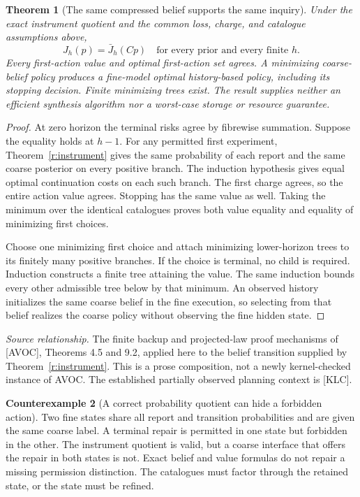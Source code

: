 \documentclass[11pt,oneside,openany]{book}
\newtheorem{theorem}{Theorem}[chapter]
\theoremstyle{definition}\newtheorem{definition}[theorem]{Definition}
\newtheorem{counterexample}[theorem]{Counterexample}
\newcommand{\source}[1]{\par{\small\textit{Source relationship.} #1}\par}
\begin{document}
\begin{theorem}[The same compressed belief supports the same inquiry]\label{r:belief-planning}
Under the exact instrument quotient and the common loss, charge, and catalogue assumptions above,
\[
 J_h(p)=\bar J_h(Cp)\quad\text{for every prior and every finite }h.
\]
Every first-action value and optimal first-action set agrees. A minimizing coarse-belief policy produces a fine-model optimal history-based policy, including its stopping decision. Finite minimizing trees exist. The result supplies neither an efficient synthesis algorithm nor a worst-case storage or resource guarantee.
\end{theorem}
\begin{proof}
At zero horizon the terminal risks agree by fibrewise summation. Suppose the equality holds at $h-1$. For any permitted first experiment, Theorem~\ref{r:instrument} gives the same probability of each report and the same coarse posterior on every positive branch. The induction hypothesis gives equal optimal continuation costs on each such branch. The first charge agrees, so the entire action value agrees. Stopping has the same value as well. Taking the minimum over the identical catalogues proves both value equality and equality of minimizing first choices.

Choose one minimizing first choice and attach minimizing lower-horizon trees to its finitely many positive branches. If the choice is terminal, no child is required. Induction constructs a finite tree attaining the value. The same induction bounds every other admissible tree below by that minimum. An observed history initializes the same coarse belief in the fine execution, so selecting from that belief realizes the coarse policy without observing the fine hidden state.
\end{proof}
\source{The finite backup and projected-law proof mechanisms of [AVOC], Theorems 4.5 and 9.2, applied here to the belief transition supplied by Theorem~\ref{r:instrument}. This is a prose composition, not a newly kernel-checked instance of AVOC. The established partially observed planning context is [KLC].}

\begin{counterexample}[A correct probability quotient can hide a forbidden action]\label{ce:permission-loss}
Two fine states share all report and transition probabilities and are given the same coarse label. A terminal repair is permitted in one state but forbidden in the other. The instrument quotient is valid, but a coarse interface that offers the repair in both states is not. Exact belief and value formulas do not repair a missing permission distinction. The catalogues must factor through the retained state, or the state must be refined.
\end{counterexample}
\end{document}

